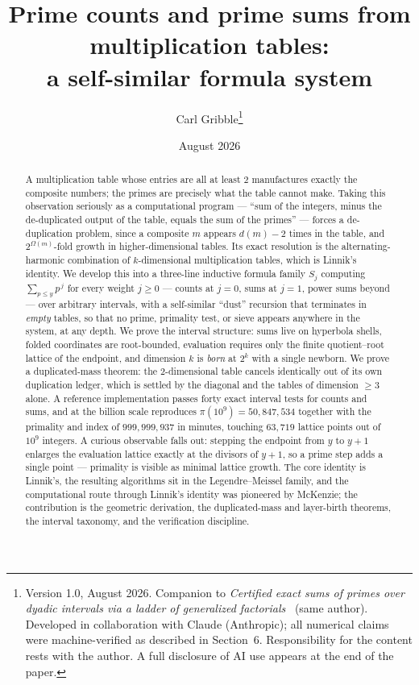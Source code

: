 \documentclass[11pt]{article}
\title{Prime counts and prime sums from multiplication tables:\\ a self-similar formula system}
\author{Carl Gribble\thanks{Version 1.0, August 2026. Companion to \emph{Certified exact sums of primes over dyadic
intervals via a ladder of generalized factorials}~\cite{Companion} (same author). Developed in collaboration with Claude
(Anthropic); all numerical claims were machine-verified as described in Section~6. Responsibility for
the content rests with the author. A full disclosure of AI use appears at the end of the paper.}}
\date{August 2026}
\theoremstyle{remark}
\begin{document}
\maketitle

\begin{abstract}
A multiplication table whose entries are all at least $2$ manufactures exactly the composite numbers;
the primes are precisely what the table cannot make. Taking this observation seriously as a computational
program --- ``sum of the integers, minus the de-duplicated output of the table, equals the sum of the
primes'' --- forces a de-duplication problem, since a composite $m$ appears $d(m)-2$ times in the table,
and $2^{\Omega(m)}$-fold growth in higher-dimensional tables. Its exact resolution is the
alternating-harmonic combination of $k$-dimensional multiplication tables, which is Linnik's identity.
We develop this into a three-line inductive formula family $S_j$ computing $\sum_{p \le y} p^{\,j}$ for
every weight $j \ge 0$ --- counts at $j=0$, sums at $j=1$, power sums beyond --- over arbitrary
intervals, with a self-similar ``dust'' recursion that terminates in \emph{empty} tables, so that no
prime, primality test, or sieve appears anywhere in the system, at any depth. We prove the interval
structure: sums live on hyperbola shells, folded coordinates are root-bounded, evaluation requires only
the finite quotient--root lattice of the endpoint, and dimension $k$ is \emph{born} at $2^k$ with a
single newborn. We prove a duplicated-mass theorem: the $2$-dimensional table cancels identically out
of its own duplication ledger, which is settled by the diagonal and the tables of dimension $\ge 3$
alone. A reference implementation passes forty exact interval tests for counts and sums, and at the
billion scale reproduces $\pi(10^9) = 50{,}847{,}534$ together with the primality and index of
$999{,}999{,}937$ in minutes, touching $63{,}719$ lattice points out of $10^9$ integers. A curious
observable falls out: stepping the endpoint from $y$ to $y+1$ enlarges the evaluation lattice exactly at
the divisors of $y+1$, so a prime step adds a single point --- primality is visible as minimal lattice
growth. The core identity is Linnik's, the resulting algorithms sit in the Legendre--Meissel family, and the
computational route through Linnik's identity was pioneered by McKenzie; the contribution is the
geometric derivation, the duplicated-mass and layer-birth theorems, the interval taxonomy, and the
verification discipline.
\end{abstract}
\end{document}
